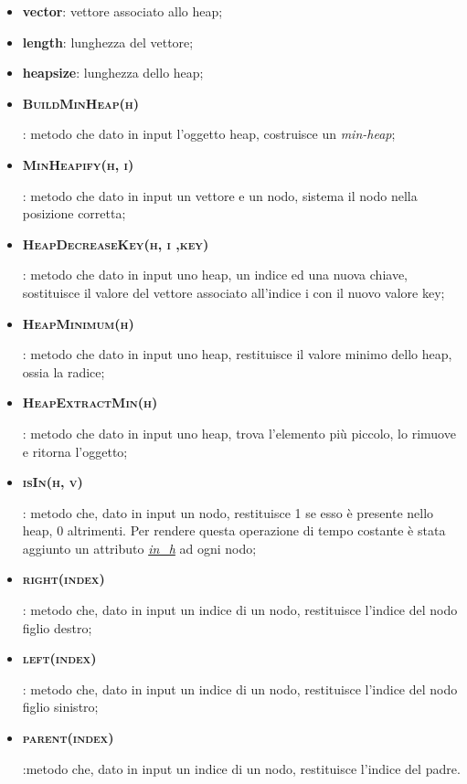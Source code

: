 \begin{itemize}
    \item \textbf{vector}: vettore associato allo heap;
    \item \textbf{length}: lunghezza del vettore;
    \item \textbf{heapsize}: lunghezza dello heap;
    \item \hypertarget{buildminheap}{\textbf{\textsc{BuildMinHeap(h)}}}: metodo che dato in input l'oggetto heap, costruisce un \textit{min-heap};
    \item \hypertarget{minheapify}{\textbf{\textsc{MinHeapify(h, i)}}}: metodo che dato in input un vettore e un nodo, sistema il nodo nella posizione corretta;
    \item \hypertarget{heapdecreasekey}{\textbf{\textsc{HeapDecreaseKey(h, i ,key)}}}: metodo che dato in input uno heap, un indice ed una nuova chiave, sostituisce il valore del vettore associato all'indice i con il nuovo valore key;
    \item \hypertarget{heapminimum}{\textbf{\textsc{HeapMinimum(h)}}}: metodo che dato in input uno heap, restituisce il valore minimo dello heap, ossia la radice;
    \item \hypertarget{heapextractmin}{\textbf{\textsc{HeapExtractMin(h)}}}: metodo che dato in input uno heap, trova l'elemento più piccolo, lo rimuove e ritorna l'oggetto;
    \item \hypertarget{isin}{\textbf{\textsc{isIn(h, v)}}}: metodo che, dato in input un nodo, restituisce 1 se esso è presente nello heap, 0 altrimenti. Per rendere questa operazione di tempo costante è stata aggiunto un attributo \hyperlink{inh}{\textit{in\_h}} ad ogni nodo;
    \item \hypertarget{right}{\textbf{\textsc{right(index)}}}: metodo che, dato in input un indice di un nodo, restituisce l'indice del nodo figlio destro;
    \item \hypertarget{left}{\textbf{\textsc{left(index)}}}: metodo che, dato in input un indice di un nodo, restituisce l'indice del nodo figlio sinistro;
    \item \hypertarget{parent}{\textbf{\textsc{parent(index)}}}:metodo che, dato in input un indice di un nodo, restituisce l'indice del padre.
\end{itemize}


\newpage


